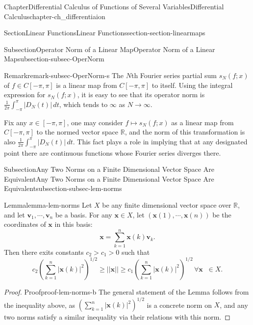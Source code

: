 \documentclass[oneside,10pt,]{book}
\numberwithin{equation}{section}
\begin{document}
\begin{chapterptx}{Chapter}{Differential Calculus of Functions of Several Variables}{}{Differential Calculus}{}{}{chapter-ch_differentiaion}
\begin{sectionptx}{Section}{Linear Functions}{}{Linear Functions}{}{}{section-section-linearmaps}
\begin{subsectionptx}{Subsection}{Operator Norm of a Linear Map}{}{Operator Norm of a Linear Map}{}{}{subsection-subsec-OperNorm}
\begin{remark}{Remark}{}{remark-subsec-OperNorm-s}%
The \(N\)th Fourier series partial sum \(s_{N}(f; x)\) of \(f\in C[-\pi, \pi]\) is a linear map from \(C[-\pi, \pi]\) to itself. Using the integral expression for \(s_{N}(f; x)\), it is easy to see that its operator norm is \(\frac{1}{2\pi} \int_{-\pi}^{\pi} |D_{N}(t)|\,dt\), which tends to \(\infty\) as \(N\to \infty\).%
\par
Fix any \(x\in [-\pi, \pi]\), one may consider \(f\mapsto s_{N}(f; x)\) as a linear map from \(C[-\pi, \pi]\) to the normed vector space \(\mathbb R\), and the norm of this transformation is also \(\frac{1}{2\pi} \int_{-\pi}^{\pi} |D_{N}(t)|\,dt\). This fact plays a role in implying that at any designated point there are continuous functions whose Fourier series diverges there.%
\end{remark}
\end{subsectionptx}
%
%
\typeout{************************************************}
\typeout{************************************************}
%
\begin{subsectionptx}{Subsection}{Any Two Norms on a Finite Dimensional Vector Space Are Equivalent}{}{Any Two Norms on a Finite Dimensional Vector Space Are Equivalent}{}{}{subsection-subsec-lem-norms}
\begin{lemma}{Lemma}{}{}{lemma-lem-norms}%
Let \(X\) be any finite dimensional vector space over \(\mathbb R\), and let \(\mathbf v_{1},\cdots, \mathbf v_{n}\) be a basis. For any \({\mathbf x}\in X\), let \(({\mathbf x}(1),\cdots, {\mathbf x}(n))\) be the coordinates of \(\mathbf x\) in this basis:%
\begin{equation*}
{\mathbf x}=\sum_{k=1}^{n} {\mathbf x}(k) \mathbf v_{k}.
\end{equation*}
Then there exits constants \(c_{2}> c_{1}>0\) such that%
\begin{equation*}
c_{2} \left(\sum_{k=1}^{n}|{\mathbf x}(k)|^{2}\right)^{1/2}\ge ||\mathbf x|| 
\ge c_{1}  \left(\sum_{k=1}^{n}|{\mathbf x}(k)|^{2}\right)^{1/2}\, \forall {\mathbf x}\;\; \in X.
\end{equation*}
%
\end{lemma}
\begin{proof}{Proof}{}{proof-lem-norms-b}
The general statement of the Lemma follows from the inequality above, as \(\left(\sum_{k=1}^{n}|{\mathbf x}(k)|^{2}\right)^{1/2}\) is a concrete norm on \(X\), and any two norms satisfy a similar inequality via their relations with this norm.%

\end{proof}
\end{subsectionptx}
\end{sectionptx}
\end{chapterptx}
\end{document}
